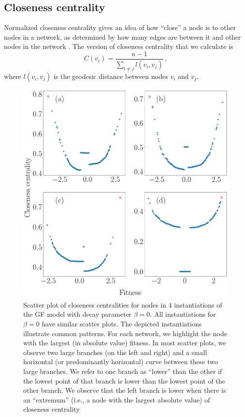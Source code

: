 \documentclass[%
 reprint,
 amsmath,amssymb,
 aps,
]{revtex4-1}
\begin{document}

\subsection{Closeness centrality}\label{close}

Normalized closeness centrality gives an idea of how ``close'' a node is to other nodes in a network, as determined by how many edges are between it and other nodes in the network \cite{newman2018}. The version of closeness centrality that we calculate is
\begin{equation}
    C(v_i) = \frac{n - 1}{\sum\limits_{i \neq j} l(v_i,v_j)}\,,
\end{equation}
where $l(v_i, v_j)$ is the geodesic distance between nodes $v_i$ and $v_j$.


\begin{figure}
    \centering
    \includegraphics[width=0.8\linewidth]{geographic_beta_0_examples2_largerfont.pdf}
    \caption{Scatter plot of closeness centralities for nodes in $4$ instantiations of the GF model with decay parameter $\beta = 0$. All instantiations for $\beta = 0$ have similar scatter plots. The depicted instantiations illustrate common patterns. For each network, we highlight the node with the largest (in absolute value) fitness. In most scatter plots, we observe two large branches (on the left and right) and a small horizontal (or predominantly horizontal) curve between these two large branches. We refer to one branch as ``lower'' than the other if the lowest point of that branch is lower than the lowest point of the other branch. We observe that the left branch is lower when there is an ``extremum'' (i.e., a node with the largest {\color{red}absolute} value) of closeness centrality
}
\end{figure}
\end{document}
